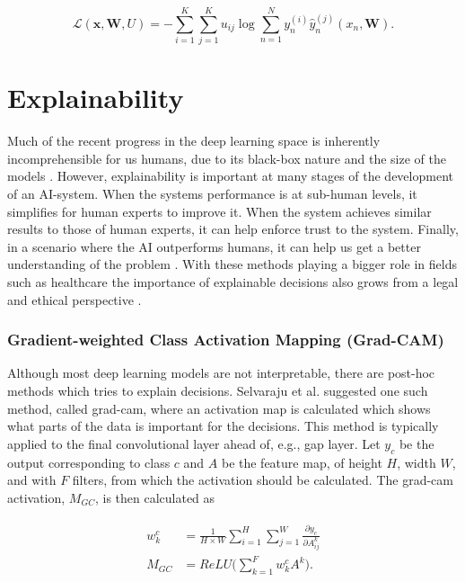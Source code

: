 \begin{equation}
    \mathcal{L}(\pmb{x}, \pmb{W}, U) = - \sum_{i=1}^K \sum_{j=1}^K u_{ij} \log \sum_{n=1}^N y_n^{(i)} \hat{y}_n^{(j)}(x_n, \pmb{W}).
    \label{eq:confusion-entropy}
\end{equation}


\section{Explainability} \label{sec:explainability}
Much of the recent progress in the deep learning space is inherently incomprehensible for us humans, due to its black-box nature and the size of the models \cite{Du2018}. However, explainability is important at many stages of the development of an AI-system. When the systems performance is at sub-human levels, it simplifies for human experts to improve it. When the system achieves similar results to those of human experts, it can help enforce trust to the system. Finally, in a scenario where the AI outperforms humans, it can help us get a better understanding of the problem \cite{Selvaraju2016}. With these methods playing a bigger role in fields such as healthcare the importance of explainable decisions also grows from a legal and ethical perspective \cite{Amann2020}.

\subsubsection{Gradient-weighted Class Activation Mapping (Grad-CAM)} \label{sec:grad-cam}
Although most deep learning models are not interpretable, there are post-hoc methods which tries to explain decisions. Selvaraju et al. \cite{Selvaraju2016} suggested one such method, called \gls{grad-cam}, where an activation map is calculated which shows what parts of the data is important for the decisions. This method is typically applied to the final convolutional layer ahead of, e.g., \gls{gap} layer. Let $y_c$ be the output corresponding to class $c$ and $A$ be the feature map, of height $H$, width $W$, and with $F$ filters, from which the activation should be calculated. The \gls{grad-cam} activation, $M_{GC}$, is then calculated as


\begin{align}
 \begin{split}
  w_k^c &= \frac{1}{H \times W} \sum_{i=1}^H \sum_{j=1}^W \frac{\partial y_c}{\partial A_{ij}^k} \\
  M_{GC} &= ReLU \big ( \sum_{k=1}^F w_k^c A^k \big).
  \label{eq:grad-cam}
 \end{split}
\end{align}

